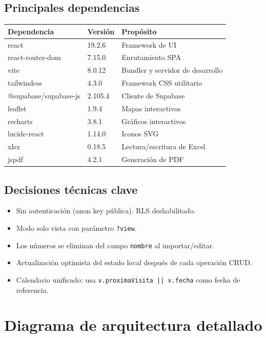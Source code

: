 \documentclass[12pt]{article}
\begin{document}
\subsection{Principales dependencias}
\begin{longtable}{@{}lll@{}}
  \toprule
  \textbf{Dependencia} & \textbf{Versi\'on} & \textbf{Prop\'osito} \\
  \midrule
  \endhead
  \bottomrule
  \endfoot
  react & 19.2.6 & Framework de UI \\
  react-router-dom & 7.15.0 & Enrutamiento SPA \\
  vite & 8.0.12 & Bundler y servidor de desarrollo \\
  tailwindcss & 4.3.0 & Framework CSS utilitario \\
  @supabase/supabase-js & 2.105.4 & Cliente de Supabase \\
  leaflet & 1.9.4 & Mapas interactivos \\
  recharts & 3.8.1 & Gr\'aficos interactivos \\
  lucide-react & 1.14.0 & Iconos SVG \\
  xlsx & 0.18.5 & Lectura/escritura de Excel \\
  jspdf & 4.2.1 & Generaci\'on de PDF \\
\end{longtable}

\subsection{Decisiones t\'ecnicas clave}
\begin{itemize}[nosep]
  \item Sin autenticaci\'on (anon key p\'ublica). RLS deshabilitado.
  \item Modo solo vista con par\'ametro \texttt{?view}.
  \item Los n\'umeros se eliminan del campo \texttt{nombre} al importar/editar.
  \item Actualizaci\'on optimista del estado local despu\'es de cada operaci\'on CRUD.
  \item Calendario unificado: usa \texttt{v.proximaVisita || v.fecha} como fecha de referencia.
\end{itemize}

\section{Diagrama de arquitectura detallado}
\end{document}
